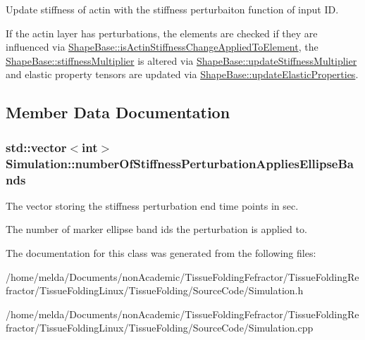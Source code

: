 Update stiffness of actin with the stiffness perturbaiton function of input I\+D. 

If the actin layer has perturbations, the elements are checked if they are influenced via \hyperlink{classShapeBase_ae9cfd1ae56e018477dd3642d4d769d90}{Shape\+Base\+::is\+Actin\+Stiffness\+Change\+Applied\+To\+Element}, the \hyperlink{classShapeBase_a9cff4a8549b3399fec12309d18b6db70}{Shape\+Base\+::stiffness\+Multiplier} is altered via \hyperlink{classShapeBase_a4eb97c0c1a988e77126809745b191c02}{Shape\+Base\+::update\+Stiffness\+Multiplier} and elastic property tensors are updated via \hyperlink{classShapeBase_a018cc92b513ff64b919c374b0767cc1b}{Shape\+Base\+::update\+Elastic\+Properties}.

\subsection{Member Data Documentation}
\hypertarget{classSimulation_ae03ad5c7859265aa5eb4d03d2e1f73d1}{}
\subsubsection[{number\+Of\+Stiffness\+Perturbation\+Applies\+Ellipse\+Bands}]{\setlength{\rightskip}{0pt plus 5cm}std\+::vector$<$int$>$ Simulation\+::number\+Of\+Stiffness\+Perturbation\+Applies\+Ellipse\+Bands}\label{classSimulation_ae03ad5c7859265aa5eb4d03d2e1f73d1}


The vector storing the stiffness perturbation end time points in sec. 

The number of marker ellipse band ids the perturbation is applied to. 

The documentation for this class was generated from the following files\+:\begin{DoxyCompactItemize}
\item 
/home/melda/\+Documents/non\+Academic/\+Tissue\+Folding\+Fefractor/\+Tissue\+Folding\+Refractor/\+Tissue\+Folding\+Linux/\+Tissue\+Folding/\+Source\+Code/Simulation.\+h\item 
/home/melda/\+Documents/non\+Academic/\+Tissue\+Folding\+Fefractor/\+Tissue\+Folding\+Refractor/\+Tissue\+Folding\+Linux/\+Tissue\+Folding/\+Source\+Code/Simulation.\+cpp\end{DoxyCompactItemize}
